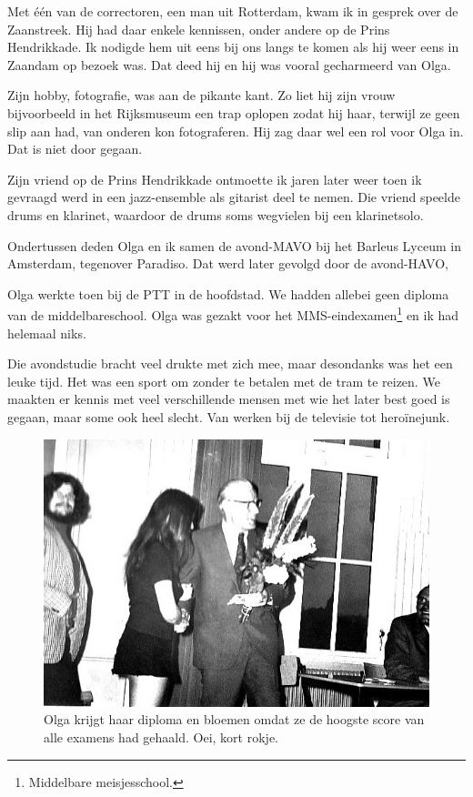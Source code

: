 \documentclass[10pt,twoside, openright]{memoir}
\begin{document}
Met één van de correctoren, een man uit Rotterdam, kwam ik in gesprek over de Zaanstreek. Hij had daar enkele kennissen, onder andere op de Prins Hendrikkade. Ik nodigde hem uit eens bij ons langs te komen als hij weer eens in Zaandam op bezoek was. Dat deed hij en hij was vooral gecharmeerd van Olga. 

Zijn hobby, fotografie, was aan de pikante kant. Zo liet hij  zijn vrouw bijvoorbeeld in het Rijksmuseum een trap oplopen zodat hij haar, terwijl ze geen slip aan had, van onderen kon fotograferen. Hij zag daar wel een rol voor Olga in. Dat is niet door gegaan. 

Zijn vriend op de Prins Hendrikkade ontmoette ik jaren later weer toen ik gevraagd werd in een jazz-ensemble als gitarist deel te nemen. Die vriend speelde drums en klarinet, waardoor  de drums soms wegvielen bij een klarinetsolo.

Ondertussen deden Olga en ik samen de avond-MAVO bij het Barleus Lyceum in Amsterdam, tegenover Paradiso. Dat werd later gevolgd door de avond-HAVO,

Olga werkte toen bij de PTT in de hoofdstad. We hadden allebei geen diploma van de middelbareschool. Olga was gezakt voor het MMS-eindexamen\footnote{Middelbare meisjesschool.} en ik had helemaal niks.

Die avondstudie bracht veel drukte met zich mee, maar desondanks was het een leuke tijd. Het was een sport om zonder te betalen met de tram te reizen. We maakten er kennis met veel verschillende mensen met wie het later best goed is gegaan, maar some ook heel slecht. Van werken bij de televisie tot heroïnejunk.

\begin{figure}
\includegraphics[width=\textwidth]{img/ch39/barleus1}
\caption*{\footnotesize Olga krijgt haar diploma en bloemen omdat ze de hoogste score van alle examens had gehaald. Oei, kort rokje.}
\end{figure}
\end{document}
